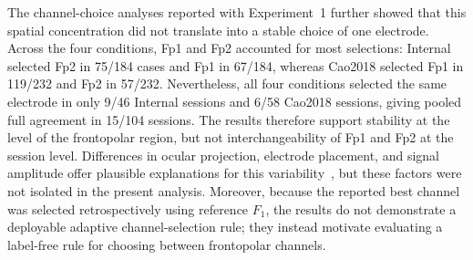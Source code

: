 The channel-choice analyses reported with Experiment~1 further showed that this spatial concentration did not translate into a stable choice of one electrode. Across the four conditions, Fp1 and Fp2 accounted for most selections: Internal selected Fp2 in 75/184 cases and Fp1 in 67/184, whereas Cao2018 selected Fp1 in 119/232 and Fp2 in 57/232. Nevertheless, all four conditions selected the same electrode in only 9/46 Internal sessions and 6/58 Cao2018 sessions, giving pooled full agreement in 15/104 sessions. The results therefore support stability at the level of the frontopolar region, but not interchangeability of Fp1 and Fp2 at the session level. Differences in ocular projection, electrode placement, and signal amplitude offer plausible explanations for this variability~\citep{plochl2012combining,guttmann2019new}, but these factors were not isolated in the present analysis. Moreover, because the reported best channel was selected retrospectively using reference $F_1$, the results do not demonstrate a deployable adaptive channel-selection rule; they instead motivate evaluating a label-free rule for choosing between frontopolar channels.
